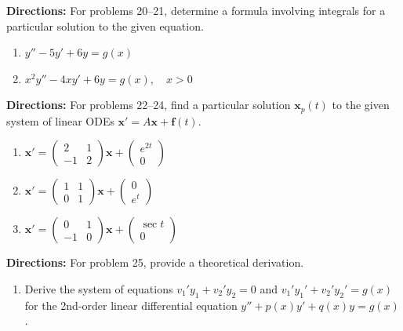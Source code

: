 \documentclass[11pt]{article}
\begin{document}
\textbf{Directions:} For problems 20--21, determine a formula involving integrals for a particular solution to the given equation.
\begin{enumerate}[resume]
    \item $y'' - 5y' + 6y = g(x)$
    \item $x^2 y'' - 4xy' + 6y = g(x), \quad x > 0$
\end{enumerate}

\textbf{Directions:} For problems 22--24, find a particular solution $\mathbf{x}_p(t)$ to the given system of linear ODEs $\mathbf{x}' = A\mathbf{x} + \mathbf{f}(t)$.
\begin{enumerate}[resume]
    \item $\mathbf{x}' = \begin{pmatrix} 2 & 1 \\ -1 & 2 \end{pmatrix} \mathbf{x} + \begin{pmatrix} e^{2t} \\ 0 \end{pmatrix}$
    \item $\mathbf{x}' = \begin{pmatrix} 1 & 1 \\ 0 & 1 \end{pmatrix} \mathbf{x} + \begin{pmatrix} 0 \\ e^t \end{pmatrix}$
    \item $\mathbf{x}' = \begin{pmatrix} 0 & 1 \\ -1 & 0 \end{pmatrix} \mathbf{x} + \begin{pmatrix} \sec t \\ 0 \end{pmatrix}$
\end{enumerate}

\textbf{Directions:} For problem 25, provide a theoretical derivation.
\begin{enumerate}[resume]
    \item Derive the system of equations $v_1'y_1 + v_2'y_2 = 0$ and $v_1'y_1' + v_2'y_2' = g(x)$ for the 2nd-order linear differential equation $y'' + p(x)y' + q(x)y = g(x)$.
\end{enumerate}
\end{document}
